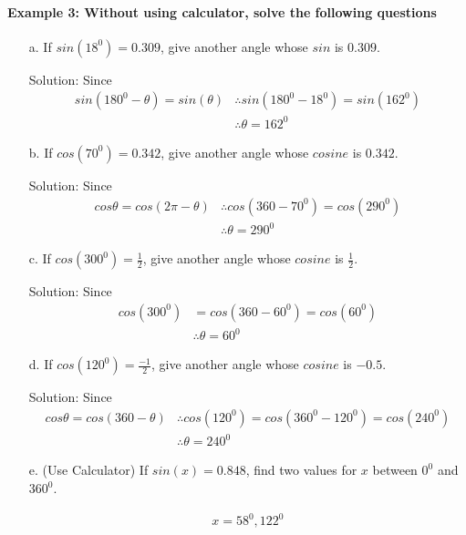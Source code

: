 \documentclass{article}
\begin{document}
\paragraph{Example 3: Without using calculator, solve the following questions}
\begin{enumerate}
  \item[a.] If $sin(18^{0})= 0.309$, give another angle whose $sin$ is $0.309$.
        
        Solution: Since
        \[
        \begin{aligned}
          sin(180^0-\theta) = sin(\theta)
          &\therefore sin(180^{0}-18^{0}) = sin(162^{0}) \\
          &\therefore \theta = 162^{0}
        \end{aligned}
        \]

  \item[b.] If $cos(70^{0})= 0.342$, give another angle whose $cosine$ is $0.342$.

        Solution: Since
        \[
        \begin{aligned}
          cos\theta = cos(2\pi - \theta)
          &\therefore cos(360-70^{0}) = cos(290^{0}) \\
          &\therefore \theta = 290^{0}
        \end{aligned}
        \]

  \item[c.] If $cos(300^{0})= \frac{1}{2}$, give another angle whose $cosine$ is $\frac{1}{2}$.

        Solution: Since
        \[
        \begin{aligned}
          cos(300^{0}) &= cos(360-60^{0}) = cos(60^{0}) \\
                       &\therefore \theta = 60^{0}
        \end{aligned}
        \]

  \item[d.] If $cos(120^{0})= \frac{-1}{2}$, give another angle whose $cosine$ is $-0.5$.

        Solution: Since
        \[
        \begin{aligned}
          cos\theta = cos(360-\theta)
          &\therefore cos(120^{0}) = cos(360^{0} - 120^{0}) = cos(240^{0}) \\
          &\therefore \theta = 240^{0}
        \end{aligned}
        \]

  \item[e.] (Use Calculator) If $sin(x)= 0.848$, find two values for $x$ between $0^{0}$ and $360^{0}$.

        \[
        \begin{aligned}
          x = 58^{0}, 122^{0}
        \end{aligned}
        \]
\end{enumerate}
\end{document}
